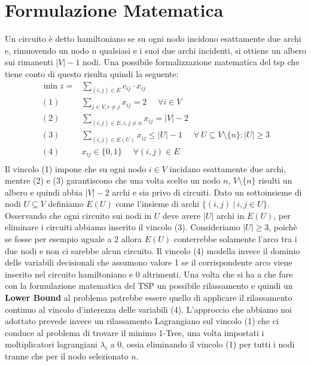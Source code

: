 \documentclass[
    article,            %
    12pt,                %
    oneside,            %
    a4paper,            %
    english,            %
    italian,                %
    sumario=tradicional,
]{abntex2}
\begin{document}
    \section{Formulazione Matematica}\label{sec:formulazione-matematica}
    Un circuito è detto hamiltoniano se su ogni nodo incidono esattamente due archi e, rimuovendo un nodo $n$ qualsiasi e i suoi due archi incidenti, si ottiene un albero sui rimanenti $|V| - 1$ nodi.
    Una possibile formalizzazione matematica del tsp che tiene conto di questo risulta quindi la seguente:
    \begin{equation*}
        \begin{split}
            \min z = & \sum_{(i,j) \in E} c_{ij} \cdot x_{ij}\\
            (1)\:\:\:\:\:\: & \sum_{j \in V, i \neq j} x_{ij} = 2 \:\:\:\:\:\: \forall i \in V \\
            (2) \:\:\:\:\:\: & \sum_{(i,j)\in E, i, j \neq n} x_{ij} = |V|-2 \\
            (3) \:\:\:\:\:\: & \sum_{(i,j) \in E(U)} x_{ij} \leq |U| - 1 \:\:\:\:\:\: \forall\: U \subseteq V\setminus\{n\} : |U| \geq 3 \\
            (4) \:\:\:\:\:\: & x_{ij} \in \{0,1\} \:\:\:\:\:\: \forall (i,j) \in E\\
        \end{split}
    \end{equation*}
    Il vincolo (1) impone che su ogni nodo $i \in V$ incidano esattamente due archi, mentre (2) e (3) garantiscono che una volta scelto un nodo $n$, $V \setminus \{n\}$ risulti un albero e quindi abbia $|V|-2$ archi e sia privo di circuiti.
    \newline
    Dato un sottoinsieme di nodi $U \subseteq V$ definiamo $E(U)$ come l'insieme di archi $\{ (i,j) \:|\: i,j \in U \}$.
    Osservando che ogni circuito sui nodi in $U$ deve avere $|U|$ archi in $E(U)$, per eliminare i circuiti abbiamo inserito il vincolo (3).
    Consideriamo $|U| \geq 3$, poichè se fosse per esempio uguale a 2 allora $E(U)$ conterrebbe solamente l'arco tra i due nodi e non ci sarebbe alcun circuito.
    Il vincolo (4) modella invece il dominio delle variabili decisionali che assumono valore 1 se il corrispondente arco viene inserito nel circuito hamiltoniano e 0 altrimenti.
    \newline
    Una volta che si ha a che fare con la formulazione matematica del TSP un possibile rilassamento e quindi un \textbf{Lower Bound} al problema potrebbe essere quello di applicare il rilassamento continuo al vincolo d'interezza delle variabili (4).
    \newline
    L'approccio che abbiamo noi adottato prevede invece un rilassamento Lagrangiano sul vincolo (1) che ci conduce al problema di trovare il minimo 1-Tree, una volta impostati i moltiplicatori lagrangiani $\lambda_i$ a 0, ossia eliminando il vincolo (1) per tutti i nodi tranne che per il nodo selezionato $n$.
\end{document}
